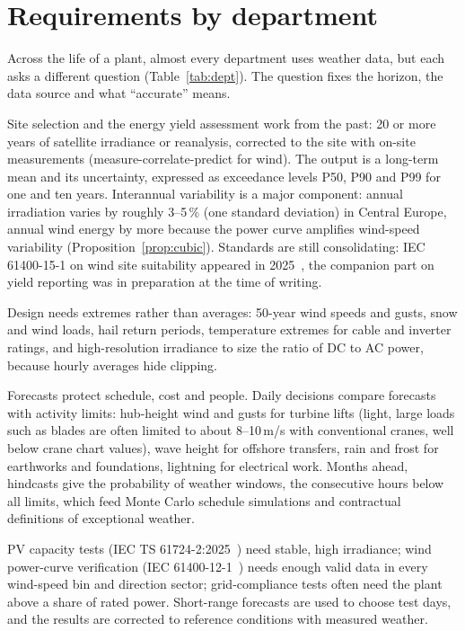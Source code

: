 \section{Requirements by department}
\label{sec:dept}

Across the life of a plant, almost every department uses weather data, but each asks a different question (Table~\ref{tab:dept}). The question fixes the horizon, the data source and what ``accurate'' means.



 Site selection and the energy yield assessment work from the past: 20 or more years of satellite irradiance or reanalysis, corrected to the site with on-site measurements (measure-correlate-predict for wind). The output is a long-term mean and its uncertainty, expressed as exceedance levels P50, P90 and P99 for one and ten years. Interannual variability is a major component: annual irradiation varies by roughly 3--5\,\% (one standard deviation) in Central Europe, annual wind energy by more because the power curve amplifies wind-speed variability (Proposition~\ref{prop:cubic}). Standards are still consolidating: IEC 61400-15-1 on wind site suitability appeared in 2025~\cite{iec61400-15-1}, the companion part on yield reporting was in preparation at the time of writing.

 Design needs extremes rather than averages: 50-year wind speeds and gusts, snow and wind loads, hail return periods, temperature extremes for cable and inverter ratings, and high-resolution irradiance to size the ratio of DC to AC power, because hourly averages hide clipping.

 Forecasts protect schedule, cost and people. Daily decisions compare forecasts with activity limits: hub-height wind and gusts for turbine lifts (light, large loads such as blades are often limited to about 8--10\,m/s with conventional cranes, well below crane chart values), wave height for offshore transfers, rain and frost for earthworks and foundations, lightning for electrical work. Months ahead, hindcasts give the probability of weather windows, the consecutive hours below all limits, which feed Monte Carlo schedule simulations and contractual definitions of exceptional weather.

 PV capacity tests (IEC TS 61724-2:2025~\cite{iec61724-2}) need stable, high irradiance; wind power-curve verification (IEC 61400-12-1~\cite{iec61400-12-1}) needs enough valid data in every wind-speed bin and direction sector; grid-compliance tests often need the plant above a share of rated power. Short-range forecasts are used to choose test days, and the results are corrected to reference conditions with measured weather.

